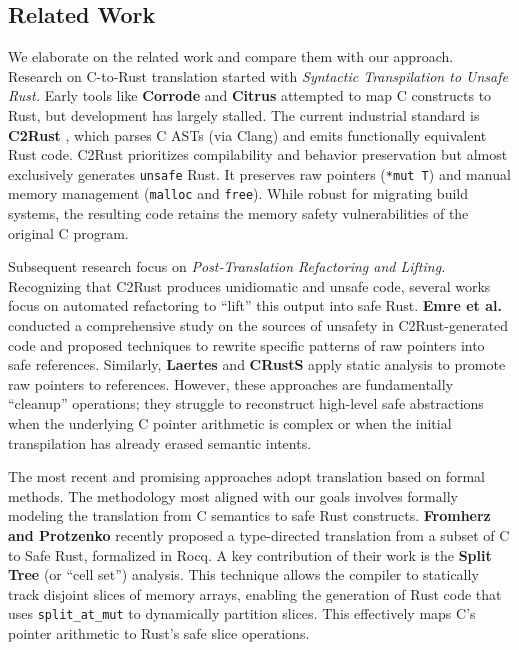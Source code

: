 \documentclass{llncs} %
\begin{document}

\subsection{Related Work}

We elaborate on the related work and compare them with our approach.
Research on C-to-Rust translation started with \emph{Syntactic Transpilation to Unsafe Rust.}
%
Early tools like \textbf{Corrode} \cite{Corrode} and \textbf{Citrus} \cite{Citrus} attempted to map C constructs to Rust, but development has largely stalled. The current industrial standard is \textbf{C2Rust} \cite{C2Rust}, which parses C ASTs (via Clang) and emits functionally equivalent Rust code. C2Rust prioritizes compilability and behavior preservation but almost exclusively generates \texttt{unsafe} Rust. It preserves raw pointers (\texttt{*mut T}) and manual memory management (\texttt{malloc} and \texttt{free}). While robust for migrating build systems, the resulting code retains the memory safety vulnerabilities of the original C program.

Subsequent research focus on \emph{Post-Translation Refactoring and Lifting.}
%
Recognizing that C2Rust produces unidiomatic and unsafe code, several works focus on automated refactoring to ``lift'' this output into safe Rust. \textbf{Emre et al.} \cite{Emre2021} conducted a comprehensive study on the sources of unsafety in C2Rust-generated code and proposed techniques to rewrite specific patterns of raw pointers into safe references. Similarly, \textbf{Laertes} \cite{Emre2021} and \textbf{CRustS} \cite{Ling2022} apply static analysis to promote raw pointers to references. However, these approaches are fundamentally ``cleanup'' operations; they struggle to reconstruct high-level safe abstractions when the underlying C pointer arithmetic is complex or when the initial transpilation has already erased semantic intents.

The most recent and promising approaches adopt translation based on formal methods.
The methodology most aligned with our goals involves formally modeling the translation from C semantics to safe Rust constructs. \textbf{Fromherz and Protzenko} \cite{Fromherz2024} recently proposed a type-directed translation from a subset of C to Safe Rust, formalized in Rocq. A key contribution of their work is the \textbf{Split Tree} (or ``cell set'') analysis. This technique allows the compiler to statically track disjoint slices of memory arrays, enabling the generation of Rust code that uses \texttt{split\_at\_mut} to dynamically partition slices. This effectively maps C's pointer arithmetic to Rust's safe slice operations.
\end{document}
